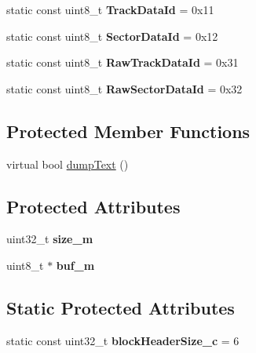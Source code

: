 \begin{DoxyCompactItemize}
\item 
\hypertarget{classH17Block_abba04ea8a19a2c67c52b2044e9d7e6b5}{}static const uint8\+\_\+t {\bfseries Track\+Data\+Id} = 0x11\label{classH17Block_abba04ea8a19a2c67c52b2044e9d7e6b5}

\item 
\hypertarget{classH17Block_aba48bf0cd556e2450f6ae849dee5aa58}{}static const uint8\+\_\+t {\bfseries Sector\+Data\+Id} = 0x12\label{classH17Block_aba48bf0cd556e2450f6ae849dee5aa58}

\item 
\hypertarget{classH17Block_af851d13f0569ae7860ce8e5953bfa5f5}{}static const uint8\+\_\+t {\bfseries Raw\+Track\+Data\+Id} = 0x31\label{classH17Block_af851d13f0569ae7860ce8e5953bfa5f5}

\item 
\hypertarget{classH17Block_a0510af71536a81a626c9956302b744bf}{}static const uint8\+\_\+t {\bfseries Raw\+Sector\+Data\+Id} = 0x32\label{classH17Block_a0510af71536a81a626c9956302b744bf}

\end{DoxyCompactItemize}
\subsection*{Protected Member Functions}
\begin{DoxyCompactItemize}
\item 
virtual bool \hyperlink{classH17Block_a09d4bee92e3b1862412b53a369f9dcc8}{dump\+Text} ()
\end{DoxyCompactItemize}
\subsection*{Protected Attributes}
\begin{DoxyCompactItemize}
\item 
\hypertarget{classH17Block_af5613c8a2286e67b7f8235162453d8c1}{}uint32\+\_\+t {\bfseries size\+\_\+m}\label{classH17Block_af5613c8a2286e67b7f8235162453d8c1}

\item 
\hypertarget{classH17Block_a279340cf9f0dba5b047297e38d430bb1}{}uint8\+\_\+t $\ast$ {\bfseries buf\+\_\+m}\label{classH17Block_a279340cf9f0dba5b047297e38d430bb1}

\end{DoxyCompactItemize}
\subsection*{Static Protected Attributes}
\begin{DoxyCompactItemize}
\item 
\hypertarget{classH17Block_a12fca0c1752b9473f618bd35cac1844f}{}static const uint32\+\_\+t {\bfseries block\+Header\+Size\+\_\+c} = 6\label{classH17Block_a12fca0c1752b9473f618bd35cac1844f}

\end{DoxyCompactItemize}


